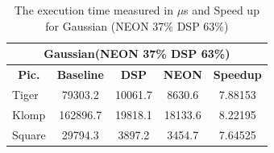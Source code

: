 \documentclass[conference]{IEEEtran}
\begin{document}
\begin{table}[!ht]
\centering
\caption{The execution time measured in  $\mu$s and Speed up for Gaussian (NEON 37\% DSP 63\%)}
\label{gauss37}
\begin{tabular}{|l|c|c|c|c|}
\hline
\multicolumn{5}{|c|}{\textbf{Gaussian(NEON 37\% DSP 63\%)}}                                                                       \\ \hline
\multicolumn{1}{|c|}{\textbf{Pic.}} & \textbf{Baseline} & \textbf{DSP} & \textbf{NEON} & \textbf{Speedup} \\ \hline
Tiger                                   & 79303.2           & 10061.7      & 8630.6        & 7.88153          \\ \hline
Klomp                                   & 162896.7          & 19818.1      & 18133.6       & 8.22195          \\ \hline
Square                                  & 29794.3           & 3897.2       & 3454.7        & 7.64525          \\ \hline
\end{tabular}
\end{table}
\end{document}

